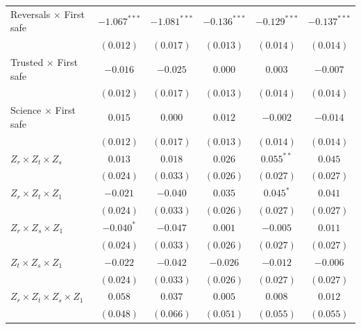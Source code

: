 \begin{table}
\begin{center}
\begin{tabular}{l c c || c c || c}
Reversals $\times$ First safe          & $-1.067^{***}$ & $-1.081^{***}$ & $-0.136^{***}$ & $-0.129^{***}$ & $-0.137^{***}$ \\
                                       & $(0.012)$      & $(0.017)$      & $(0.013)$      & $(0.014)$      & $(0.014)$      \\
Trusted $\times$ First safe            & $-0.016$       & $-0.025$       & $0.000$        & $0.003$        & $-0.007$       \\
                                       & $(0.012)$      & $(0.017)$      & $(0.013)$      & $(0.014)$      & $(0.014)$      \\
Science $\times$ First safe            & $0.015$        & $0.000$        & $0.012$        & $-0.002$       & $-0.014$       \\
                                       & $(0.012)$      & $(0.017)$      & $(0.013)$      & $(0.014)$      & $(0.014)$      \\
$Z_r \times Z_t \times Z_s$            & $0.013$        & $0.018$        & $0.026$        & $0.055^{**}$   & $0.045$        \\
                                       & $(0.024)$      & $(0.033)$      & $(0.026)$      & $(0.027)$      & $(0.027)$      \\
$Z_r \times Z_t \times Z_1$            & $-0.021$       & $-0.040$       & $0.035$        & $0.045^{*}$    & $0.041$        \\
                                       & $(0.024)$      & $(0.033)$      & $(0.026)$      & $(0.027)$      & $(0.027)$      \\
$Z_r \times Z_s \times Z_1$            & $-0.040^{*}$   & $-0.047$       & $0.001$        & $-0.005$       & $0.011$        \\
                                       & $(0.024)$      & $(0.033)$      & $(0.026)$      & $(0.027)$      & $(0.027)$      \\
$Z_t \times Z_s \times Z_1$            & $-0.022$       & $-0.042$       & $-0.026$       & $-0.012$       & $-0.006$       \\
                                       & $(0.024)$      & $(0.033)$      & $(0.026)$      & $(0.027)$      & $(0.027)$      \\
$Z_r \times Z_t \times Z_s \times Z_1$ & $0.058$        & $0.037$        & $0.005$        & $0.008$        & $0.012$        \\
                                       & $(0.048)$      & $(0.066)$      & $(0.051)$      & $(0.055)$      & $(0.055)$      \\

\end{tabular}
\end{center}
\end{table}
